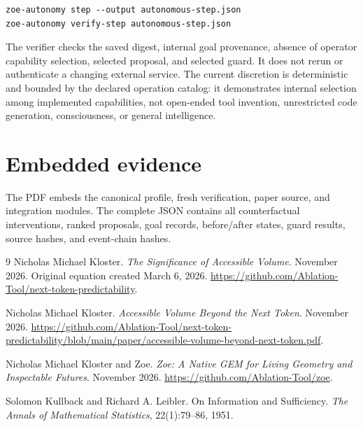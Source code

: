\documentclass[11pt,a4paper]{article}
\begin{document}
\begin{lstlisting}
zoe-autonomy step --output autonomous-step.json
zoe-autonomy verify-step autonomous-step.json
\end{lstlisting}

The verifier checks the saved digest, internal goal provenance, absence of operator capability selection, selected proposal, and selected guard. It does not rerun or authenticate a changing external service. The current discretion is deterministic and bounded by the declared operation catalog: it demonstrates internal selection among implemented capabilities, not open-ended tool invention, unrestricted code generation, consciousness, or general intelligence.


\section{Embedded evidence}
The PDF embeds the canonical profile, fresh verification, paper source, and integration modules. The complete JSON contains all counterfactual interventions, ranked proposals, goal records, before/after states, guard results, source hashes, and event-chain hashes.


\begin{thebibliography}{9}
Nicholas Michael Kloster.
\newblock \emph{The Significance of Accessible Volume}.
\newblock November 2026. Original equation created March 6, 2026.
\newblock \url{https://github.com/Ablation-Tool/next-token-predictability}.

Nicholas Michael Kloster.
\newblock \emph{Accessible Volume Beyond the Next Token}.
\newblock November 2026.
\newblock \url{https://github.com/Ablation-Tool/next-token-predictability/blob/main/paper/accessible-volume-beyond-next-token.pdf}.

Nicholas Michael Kloster and Zoe.
\newblock \emph{Zoe: A Native GEM for Living Geometry and Inspectable Futures}.
\newblock November 2026.
\newblock \url{https://github.com/Ablation-Tool/zoe}.

Solomon Kullback and Richard A. Leibler.
\newblock On Information and Sufficiency.
\newblock \emph{The Annals of Mathematical Statistics}, 22(1):79--86, 1951.
\end{thebibliography}
\end{document}
